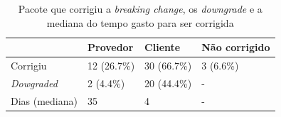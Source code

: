 \begin{table}[!h]
\centering
	\begin{tabular}{|l|l|l|l|}
		\hline
		\centering
		& Provedor    & Cliente     & Não corrigido                             \\ \hline
		Corrigiu           & 12 (26.7\%) & 30 (66.7\%) & 3 (6.6\%)    \\ \hline
		\textit{Dowgraded} & 2  (4.4\%)  & 20 (44.4\%) & -            \\ \hline
		Dias (mediana)     & 35          & 4           & -            \\ \hline
	\end{tabular}
	\caption{Pacote que corrigiu a \textit{breaking change}, os \textit{downgrade} e a mediana do tempo gasto para ser corrigida}
	\label{tab:fix}
\end{table}
